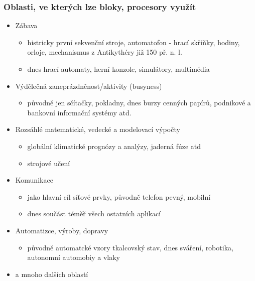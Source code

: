 \documentclass{beamer}
\begin{document}
\begin{frame}
\frametitle{Oblasti, ve kterých lze bloky, procesory využít}

\begin{itemize}
 \item Zábava
 \begin{itemize}
  \item histricky první sekvenční stroje, automatofon - hrací skříňky, hodiny, orloje, mechanismus z Antikythéry již 150 př. n. l.
  \item dnes hrací automaty, herní konzole, simulátory, multimédia
 \end{itemize}
 \item Výdělečná zaneprázdněnost/aktivity (busyness)
 \begin{itemize}
  \item původně jen sčítačky, pokladny, dnes burzy cenných papírů, podnikové a bankovní informační systémy atd.
 \end{itemize}
 \item Rozsáhlé matematické, vedecké a modelovací výpočty
 \begin{itemize}
  \item globální klimatické prognózy a analýzy, jaderná fúze atd
  \item strojové učení
 \end{itemize}
 \item Komunikace
 \begin{itemize}
  \item jako hlavní cíl síťové prvky, původně telefon pevný, mobilní
  \item dnes součást téměř všech ostatních aplikací
 \end{itemize}
 \item Automatizce, výroby, dopravy
 \begin{itemize}
  \item původně automatcké vzory tkalcovský stav, dnes sváření, robotika, autonomní automobiy a vlaky
 \end{itemize}
 \item a mnoho dalších oblastí
\end{itemize}
\end{frame}
\end{document}
